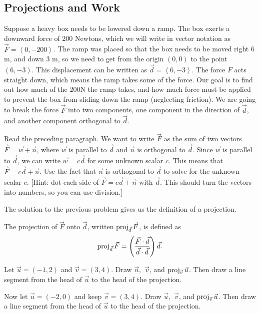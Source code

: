 \subsection{Projections and Work}
Suppose a heavy box needs to be lowered down a ramp.  
The box exerts a downward force of 200 Newtons, which we will write in vector notation as $\vec F=\left<0,-200\right>$. 
The ramp was placed so that the box needs to be moved right 6 m, and down 3 m, so we need to get from the origin $(0,0)$ to the point $(6,-3)$.  This displacement can be written as $\vec d=\left<6,-3\right>$. The force $F$ acts straight down, which means the ramp takes some of the force. Our goal is to find out how much of the 200N the ramp takes, and how much force must be applied to prevent the box from sliding down the ramp (neglecting friction). We are going to break the force $\vec F$ into two components, one component in the direction of $\vec d$, and another component orthogonal to $\vec d$. 

\begin{problem}\label{force intro}
Read the preceding paragraph. We want to write $\vec F$ as the sum of two vectors $\vec F = \vec w+\vec n$, where $\vec w$ is parallel to $\vec d$ and $\vec n$ is orthogonal to $\vec d$.
Since $\vec w$ is parallel to $\vec d$, we can write $\vec w=c\vec d$ for some unknown scalar $c$.
This means that $\vec F=c\vec d+\vec n$.  Use the fact that $\vec n$ is orthogonal to $\vec d$ to solve for the unknown scalar $c$.  [Hint:  dot each side of $\vec F=c\vec d+\vec n$ with $\vec d$. This should turn the vectors into numbers, so you can use division.]
\end{problem}
The solution to the previous problem gives us the definition of a projection.
\begin{definition}
The projection of $\vec F$ onto $\vec d$, written $\operatorname{proj}_{\vec d}\vec F$, is defined as $$\operatorname{proj}_{\vec d}\vec F = \left(\frac{\vec F\cdot \vec d}{\vec d\cdot \vec d}\right)\vec d.$$
\end{definition}

\begin{problem} 
%
Let $\vec u=(-1,2)$ and $\vec v=(3,4)$. Draw $\vec u,$ $\vec v$, and $\operatorname{proj}_{\vec v}\vec u$. Then draw a line segment from the head of $\vec u$ to the head of the projection.

Now let $\vec u=(-2,0)$ and keep $\vec v=(3,4)$. Draw $\vec u,$ $\vec v$, and $\operatorname{proj}_{\vec v}\vec u$. Then draw a line segment from the head of $\vec u$ to the head of the projection.

\end{problem}


